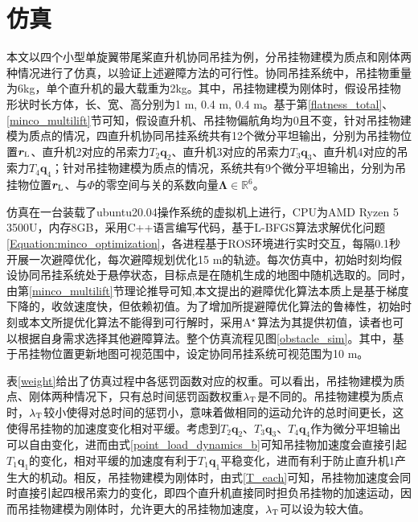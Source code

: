 \section{仿真}\label{Section6:simulation}

本文以四个小型单旋翼带尾桨直升机协同吊挂为例，分吊挂物建模为质点和刚体两种情况进行了仿真，以验证上述避障方法的可行性。协同吊挂系统中，吊挂物重量为6kg，单个直升机的最大载重为2kg。其中，吊挂物建模为刚体时，假设吊挂物形状时长方体，长、宽、高分别为1 m, 0.4 m, 0.4 m。基于第\ref{flatness_total}、\ref{minco_multilift}节可知，假设直升机、吊挂物偏航角均为0且不变，针对吊挂物建模为质点的情况，四直升机协同吊挂系统共有12个微分平坦输出，分别为吊挂物位置$\boldsymbol{r}_{\rm{L}}$、直升机2对应的吊索力$T_2\boldsymbol{q}_2$、直升机3对应的吊索力$T_3\boldsymbol{q}_3$、直升机4对应的吊索力$T_4\boldsymbol{q}_4$；针对吊挂物建模为质点的情况，系统共有9个微分平坦输出，分别为吊挂物位置$\boldsymbol{r}_{\rm{L}}$、与$\Phi$的零空间与关的系数向量$\boldsymbol{\Lambda} \in \mathbb{R}^6$。


仿真在一台装载了ubuntu20.04操作系统的虚拟机上进行，CPU为AMD Ryzen 5 3500U，内存8GB，采用C++语言编写代码，基于L-BFGS算法\cite{liu1989limited}求解优化问题\ref{Equation:minco_optimization}，各进程基于ROS环境进行实时交互，每隔0.1秒开展一次避障优化，每次避障规划优化15 m的轨迹。每次仿真中，初始时刻均假设协同吊挂系统处于悬停状态，目标点是在随机生成的地图中随机选取的。同时，由第\ref{minco_multilift}节理论推导可知,本文提出的避障优化算法本质上是基于梯度下降的，收敛速度快，但依赖初值。为了增加所提避障优化算法的鲁棒性，初始时刻或本文所提优化算法不能得到可行解时，采用$\rm{A^\star}$算法为其提供初值，读者也可以根据自身需求选择其他避障算法。整个仿真流程见图\ref{obstacle_sim}。其中，基于吊挂物位置更新地图可视范围中，设定协同吊挂系统可视范围为10 m。


表\ref{weight}给出了仿真过程中各惩罚函数对应的权重。可以看出，吊挂物建模为质点、刚体两种情况下，只有总时间惩罚函数权重$\lambda_{\rm{T}}$是不同的。吊挂物建模为质点时，$\lambda_{\rm{T}}$较小使得对总时间的惩罚小，意味着做相同的运动允许的总时间更长，这使得吊挂物的加速度变化相对平缓。考虑到$T_2\boldsymbol{q}_2$、$T_3\boldsymbol{q}_3$、$T_4\boldsymbol{q}_4$作为微分平坦输出可以自由变化，进而由式\ref{point_load_dynamics_b}可知吊挂物加速度会直接引起$T_1\boldsymbol{q}_1$的变化，相对平缓的加速度有利于$T_1\boldsymbol{q}_1$平稳变化，进而有利于防止直升机1产生大的机动。相反，吊挂物建模为刚体时，由式\ref{T_each}可知，吊挂物加速度会同时直接引起四根吊索力的变化，即四个直升机直接同时担负吊挂物的加速运动，因而吊挂物建模为刚体时，允许更大的吊挂物加速度，$\lambda_{\rm{T}}$可以设为较大值。


